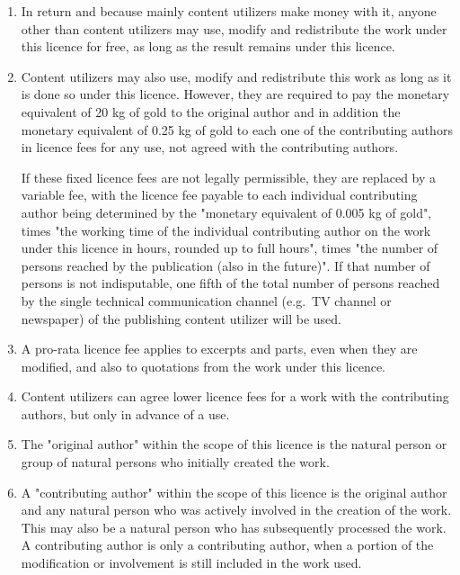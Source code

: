 \documentclass[a4paper,8pt]{extarticle}
\begin{document}
\begin{enumerate}
 \item In return and because mainly content utilizers make money with it, anyone other than content utilizers may use, modify and redistribute the work under this licence for free, as long as the result remains under this licence.

 \item \label{ENcosts} Content utilizers may also use, modify and redistribute this work as long as it is done so under this licence. However, they are required to pay the monetary equivalent of 20 kg of gold to the original author and in addition the monetary equivalent of 0.25 kg of gold to each one of the contributing authors in licence fees for any use, not agreed with the contributing authors.
 
 If these fixed licence fees are not legally permissible, they are replaced by a variable fee, with the licence fee payable to each individual contributing author being determined by the "monetary equivalent of 0.005 kg of gold", times "the working time of the individual contributing author on the work under this licence in hours, rounded up to full hours", times "the number of persons reached by the publication (also in the future)". If that number of persons is not indisputable, one fifth of the total number of persons reached by the single technical communication channel (e.g.\ TV channel or newspaper) of the publishing content utilizer will be used.

 \item A pro-rata licence fee applies to excerpts and parts, even when they are modified, and also to quotations from the work under this licence.

 \item Content utilizers can agree lower licence fees for a work with the contributing authors, but only in advance of a use.

 \item The "original author" within the scope of this licence is the natural person or group of natural persons who initially created the work.

 \item A "contributing author" within the scope of this licence is the original author and any natural person who was actively involved in the creation of the work. This may also be a natural person who has subsequently processed the work. A contributing author is only a contributing author, when a portion of the modification or involvement is still included in the work used.


\end{enumerate}
\end{document}
